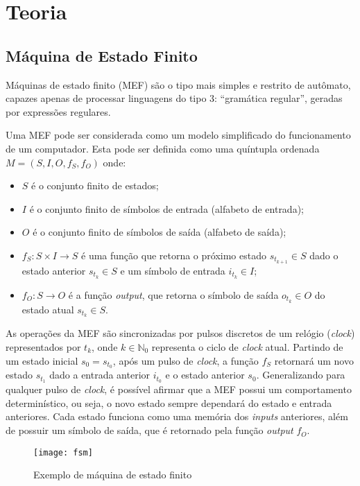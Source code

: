 \section{Teoria}

\subsection{Máquina de Estado Finito}

Máquinas de estado finito (MEF) são o tipo mais simples e restrito de autômato,
capazes apenas de processar linguagens do tipo 3: ``gramática regular'',
geradas por expressões regulares.

Uma MEF pode ser considerada como um modelo simplificado do funcionamento de um
computador. Esta pode ser definida como uma quíntupla ordenada $M = (S, I, O,
f_S, f_O)$ onde:
\begin{itemize}
    \item $S$ é o conjunto finito de estados;
    \item $I$ é o conjunto finito de símbolos de entrada (alfabeto de entrada);
    \item $O$ é o conjunto finito de símbolos de saída (alfabeto de saída);
    \item $f_S: S \times I \rightarrow S$ é uma função que retorna o próximo
          estado $s_{t_{k+1}} \in S$ dado o estado anterior $s_{t_k} \in S$ e
          um símbolo de entrada $i_{t_k} \in I$;
    \item $f_O: S \rightarrow O$ é a função \textit{output}, que retorna o
          símbolo de saída $o_{t_k} \in O$ do estado atual $s_{t_k} \in S$.
\end{itemize}

As operações da MEF são sincronizadas por pulsos discretos de um relógio
(\textit{clock}) representados por $t_k$, onde $k \in \mathbb{N}_0$ representa o
ciclo de \textit{clock} atual. Partindo de um estado inicial $s_0 = s_{t_0}$,
após um pulso de \textit{clock}, a função $f_S$ retornará um novo estado
$s_{t_1}$ dado a entrada anterior $i_{t_0}$ e o estado anterior $s_0$.
Generalizando para qualquer pulso de \textit{clock}, é possível afirmar que a
MEF possui um comportamento determinístico, ou seja, o novo estado sempre
dependará do estado e entrada anteriores. Cada estado funciona como uma memória
dos \textit{inputs} anteriores, além de possuir um símbolo de saída, que é
retornado pela função \textit{output} $f_O$.

\begin{figure}[H]
    \centering
    \texttt{[image: fsm]}
    \caption{Exemplo de máquina de estado finito}
    \label{fig:fsm}
\end{figure}

